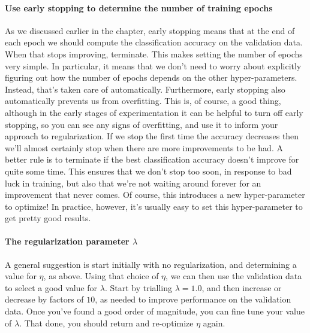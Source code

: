 \documentclass[12pt, letterpaper]{article}
\theoremstyle{definition}
\let\tb\textbf
\begin{document}
\paragraph{\tb{Use early stopping to determine the number of training epochs}} As we discussed earlier in the chapter, early stopping means that at the end of each epoch we should compute the classification accuracy on the validation data. When that stops improving, terminate. This makes setting the number of epochs very simple. In particular, it means that we don't need to worry about explicitly figuring out how the number of epochs depends on the other hyper-parameters. Instead, that's taken care of automatically. Furthermore, early stopping also automatically prevents us from overfitting. This is, of course, a good thing, although in the early stages of experimentation it can be helpful to turn off early stopping, so you can see any signs of overfitting, and use it to inform your approach to regularization. If we stop the first time the accuracy decreases then we'll almost certainly stop when there are more improvements to be had. A better rule is to terminate if the best classification accuracy doesn't improve for quite some time. This ensures that we don't stop too soon, in response to bad luck in training, but also that we're not waiting around forever for an improvement that never comes. Of course, this introduces a new hyper-parameter to optimize! In practice, however, it's usually easy to set this hyper-parameter to get pretty good results.

\paragraph{\tb{The regularization parameter $\lambda$}} A general suggestion is start initially with no regularization, and determining a value for $\eta$, as above. Using that choice of $\eta$, we can then use the validation data to select a good value for $\lambda$. Start by trialling $\lambda=1.0$, and then increase or decrease by factors of $10$, as needed to improve performance on the validation data. Once you've found a good order of magnitude, you can fine tune your value of $\lambda$. That done, you should return and re-optimize $\eta$  again.
\end{document}
